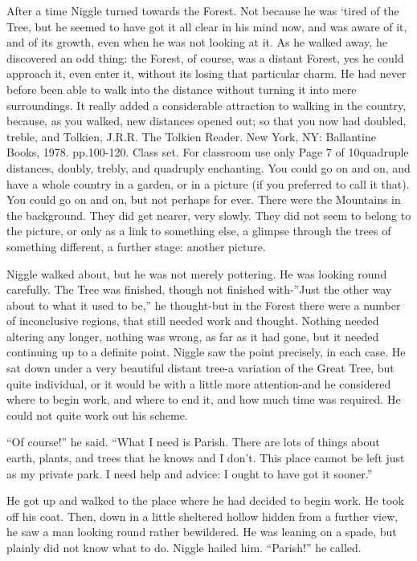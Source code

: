 \documentclass[english]{scrartcl}
\begin{document}
After a time Niggle turned towards the Forest. Not because he was ‘tired of the Tree, but he seemed to have got it all clear in his mind now, and was aware of it, and of its growth, even when he was not looking at it. As he walked away, he discovered an odd thing: the Forest, of course, was a distant Forest, yes he could approach it, even enter it, without its losing that particular charm. He had never before been able to walk into the distance without turning it into mere surroundings. It really added a considerable attraction to walking in the country, because, as you walked, new distances opened out; so that you now had doubled, treble, and Tolkien, J.R.R. The Tolkien Reader. New York, NY: Ballantine Books, 1978. pp.100-120. Class set. For classroom use only Page 7 of 10quadruple distances, doubly, trebly, and quadruply enchanting. You could go on and on, and have a whole country in a garden, or in a picture (if you preferred to call it that). You could go on and on, but not perhaps for ever. There were the Mountains in the background. They did get nearer, very slowly. They did not seem to belong to the picture, or only as a link to something else, a glimpse through the trees of something different, a further stage: another picture.

Niggle walked about, but he was not merely pottering. He was looking round carefully. The Tree was finished, though not finished with-”Just the other way about to what it used to be,” he thought-but in the Forest there were a number of inconclusive regions, that still needed work and thought. Nothing needed altering any longer, nothing was wrong, as far as it had gone, but it needed continuing up to a definite point. Niggle saw the point precisely, in each case. He sat down under a very beautiful distant tree-a variation of the Great Tree, but quite individual, or it would be with a little more attention-and he considered where to begin work, and where to end it, and how much time was required. He could not quite work out his scheme.

“Of course!” he said. “What I need is Parish. There are lots of things about earth, plants, and trees that he knows and I don’t. This place cannot be left just as my private park. I need help and advice: I ought to have got it sooner.”

He got up and walked to the place where he had decided to begin work. He took off his coat. Then, down in a little sheltered hollow hidden from a further view, he saw a man looking round rather bewildered. He was leaning on a spade, but plainly did not know what to do. Niggle hailed him. “Parish!” he called.
\end{document}
